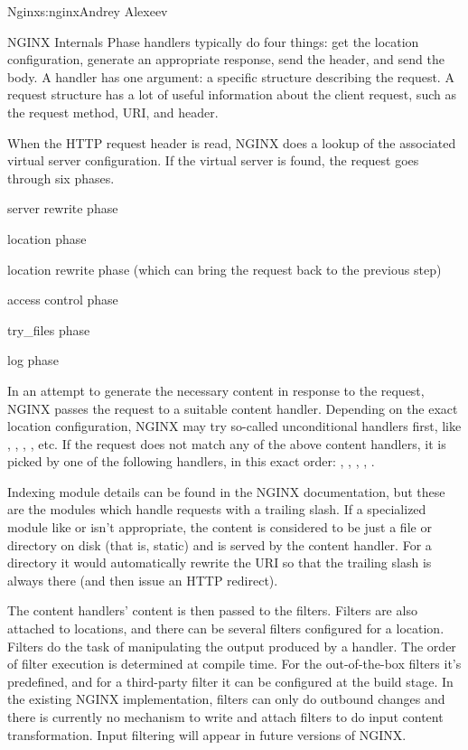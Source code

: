 \begin{aosachapter}{Nginx}{s:nginx}{Andrey Alexeev}
\begin{aosasect1}{NGINX Internals}
Phase handlers typically do four things: get the location
configuration, generate an appropriate response, send the header, and
send the body. A handler has one argument: a specific structure
describing the request. A request structure has a lot of useful
information about the client request, such as the request method, URI,
and header.

When the HTTP request header is read, NGINX does a lookup of the
associated virtual server configuration. If the virtual server is
found, the request goes through six phases.

\begin{aosaenumerate}

\item server rewrite phase

\item location phase

\item location rewrite phase (which can bring the request back to the
previous step)

\item access control phase

\item try\_files phase

\item log phase

\end{aosaenumerate}

In an attempt to generate the necessary content in response to the
request, NGINX passes the request to a suitable content
handler. Depending on the exact location configuration, NGINX may try
so-called unconditional handlers first, like ,
, , , etc. If the request does
not match any of the above content handlers, it is picked by one of
the following handlers, in this exact order: ,
, , , .

Indexing module details can be found in the NGINX documentation, but
these are the modules which handle requests with a trailing slash. If
a specialized module like  or  isn't
appropriate, the content is considered to be just a file or directory
on disk (that is, static) and is served by the  content
handler. For a directory it would automatically rewrite the URI so
that the trailing slash is always there (and then issue an HTTP
redirect).

The content handlers' content is then passed to the filters. Filters
are also attached to locations, and there can be several filters
configured for a location. Filters do the task of manipulating the
output produced by a handler. The order of filter execution is
determined at compile time. For the out-of-the-box filters it's
predefined, and for a third-party filter it can be configured at the
build stage. In the existing NGINX implementation, filters can only do
outbound changes and there is currently no mechanism to write and
attach filters to do input content transformation. Input filtering
will appear in future versions of NGINX.


\end{aosasect1}
\end{aosachapter}

